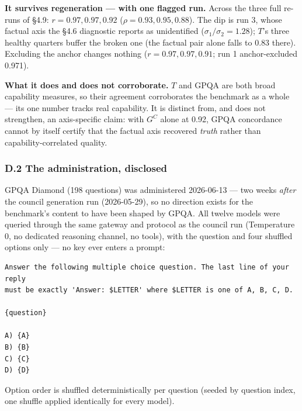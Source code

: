 \textbf{It survives regeneration --- with one flagged run.} Across the three full re-runs of §4.9: \(r = 0.97, 0.97, 0.92\) (\(\rho = 0.93, 0.95, 0.88\)). The dip is run 3, whose factual axis the §4.6 diagnostic reports as unidentified (\(\sigma_1/\sigma_2 = 1.28\)); \(T\)'s three healthy quarters buffer the broken one (the factual pair alone falls to 0.83 there). Excluding the anchor changes nothing (\(r = 0.97, 0.97, 0.91\); run 1 anchor-excluded 0.971).

\textbf{What it does and does not corroborate.} \(T\) and GPQA are both broad capability measures, so their agreement corroborates the benchmark as a whole --- its one number tracks real capability. It is distinct from, and does not strengthen, an axis-specific claim: with \(G^{C}\) alone at 0.92, GPQA concordance cannot by itself certify that the factual axis recovered \emph{truth} rather than capability-correlated quality.

\subsubsection{D.2 The administration, disclosed}\label{d.2-the-administration-disclosed}

GPQA Diamond (198 questions) was administered 2026-06-13 --- two weeks \emph{after} the council generation run (2026-05-29), so no direction exists for the benchmark's content to have been shaped by GPQA. All twelve models were queried through the same gateway and protocol as the council run (Temperature 0, no dedicated reasoning channel, no tools), with the question and four shuffled options only --- no key ever enters a prompt:

\begin{verbatim}
Answer the following multiple choice question. The last line of your reply
must be exactly 'Answer: $LETTER' where $LETTER is one of A, B, C, D.

{question}

A) {A}
B) {B}
C) {C}
D) {D}
\end{verbatim}

Option order is shuffled deterministically per question (seeded by question index, one shuffle applied identically for every model).

